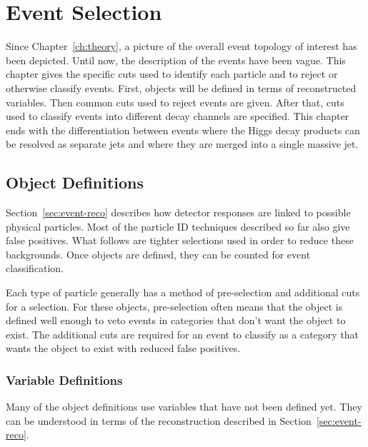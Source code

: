 \chapter{Event Selection} \label{ch:selection}

Since Chapter~\ref{ch:theory},
a picture of the overall event topology of interest has been depicted.
Until now, the description of the events have been vague.
This chapter gives the specific cuts used to identify each particle
and to reject or otherwise classify events.
First, objects will be defined in terms of reconstructed variables.
Then common cuts used to reject events are given.
After that, cuts used to classify events into different decay channels are specified.
This chapter ends with the differentiation between events where
the Higgs decay products can be resolved as separate jets
and where they are merged into a single massive jet.

\section{Object Definitions}

Section~\ref{sec:event-reco} describes how
detector responses are linked to possible physical particles.
Most of the particle ID techniques described so far also give false positives.
What follows are tighter selections used in order to reduce these backgrounds.
Once objects are defined, they can be counted for event classification.

Each type of particle generally has a method of pre-selection
and additional cuts for a selection.
For these objects, pre-selection often means that the object is defined
well enough to veto events in categories that don't want the object to exist.
The additional cuts are required for an event to classify as a category
that wants the object to exist with reduced false positives.

\subsection{Variable Definitions}

Many of the object definitions use variables that have not been defined yet.
They can be understood in terms of the reconstruction
described in Section~\ref{sec:event-reco}.

